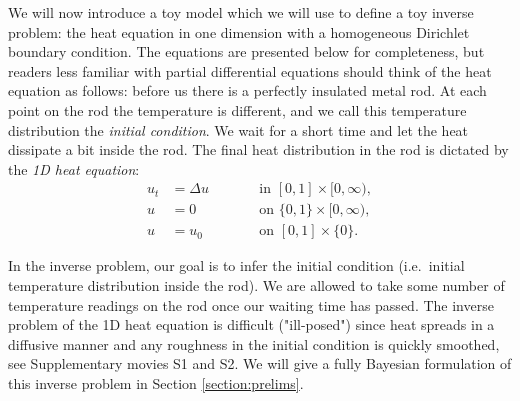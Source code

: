 
We will now introduce a toy model which we will use to define a toy
inverse problem: the heat equation in one dimension with a homogeneous
Dirichlet boundary condition. The equations are presented below for
completeness, but readers less familiar with partial differential
equations should think of the heat equation as follows: before us
there is a perfectly insulated metal rod. At each point on the rod the
temperature is different, and we call this temperature distribution
the \emph{initial condition}. We wait for a short time and let the
heat dissipate a bit inside the rod. The final heat distribution in
the rod is dictated by the \emph{1D heat equation}:
\begin{subequations}\label{eq:heat equation}
  \begin{alignat}{2}
    u_t &= \Delta u &&\qquad \text{in } [0,1] \times [0,\infty),\\ u
      &= 0 &&\qquad \text{on } \{0, 1\} \times [0,\infty),\\ u &= u_0
        &&\qquad \text{on }[0,1] \times \{0\}.
  \end{alignat}
\end{subequations}

In the inverse problem, our goal is to infer the initial condition
(i.e.~initial temperature distribution inside the rod). We are allowed
to take some number of temperature readings on the rod once our
waiting time has passed. The inverse problem of the 1D heat equation
is difficult ("ill-posed") since heat spreads in a diffusive manner
and any roughness in the initial condition is quickly smoothed, see
Supplementary movies S1 and S2. We will give a fully Bayesian
formulation of this inverse problem in Section \ref{section:prelims}.


